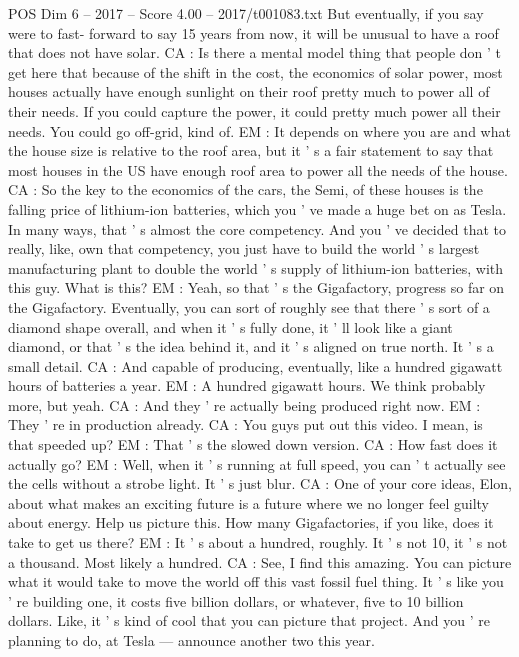 \begin{textsample}{POS Dim 6 – 2017 – Score 4.00 – 2017/t001083.txt}
But eventually, if you say were to fast- forward to say 15 years from now, it will be unusual to have a roof that does not have solar.
CA : Is there a mental model thing that people don ' t get here that because of the shift in the cost, the economics of solar power, most houses actually have enough sunlight on their roof pretty much to power all of their needs.
If you could capture the power, it could pretty much power all their needs.
You could go off-grid, kind of.
EM : It depends on where you are and what the house size is relative to the roof area, but it ' s a fair statement to say that most houses in the US have enough roof area to power all the needs of the house.
CA : So the key to the economics of the cars, the Semi, of these houses is the falling price of lithium-ion batteries, which you ' ve made a huge bet on as Tesla.
In many ways, that ' s almost the core competency.
And you ' ve decided that to really, like, own that competency, you just have to build the world ' s largest manufacturing plant to double the world ' s supply of lithium-ion batteries, with this guy.
What is this?
EM : Yeah, so that ' s the Gigafactory, progress so far on the Gigafactory.
Eventually, you can sort of roughly see that there ' s sort of a diamond shape overall, and when it ' s fully done, it ' ll look like a giant diamond, or that ' s the idea behind it, and it ' s aligned on true north.
It ' s a small detail.
CA : And capable of producing, eventually, like a hundred gigawatt hours of batteries a year.
EM : A hundred gigawatt hours.
We think probably more, but yeah.
CA : And they ' re actually being produced right now.
EM : They ' re in production already.
CA : You guys put out this video.
I mean, is that speeded up?
EM : That ' s the slowed down version.
CA : How fast does it actually go?
EM : Well, when it ' s running at full speed, you can ' t actually see the cells without a strobe light.
It ' s just blur.
CA : One of your core ideas, Elon, about what makes an exciting future is a future where we no longer feel guilty about energy.
Help us picture this.
How many Gigafactories, if you like, does it take to get us there?
EM : It ' s about a hundred, roughly.
It ' s not 10, it ' s not a thousand.
Most likely a hundred.
CA : See, I find this amazing.
You can picture what it would take to move the world off this vast fossil fuel thing.
It ' s like you ' re building one, it costs five billion dollars, or whatever, five to 10 billion dollars.
Like, it ' s kind of cool that you can picture that project.
And you ' re planning to do, at Tesla — announce another two this year.

\end{textsample}
